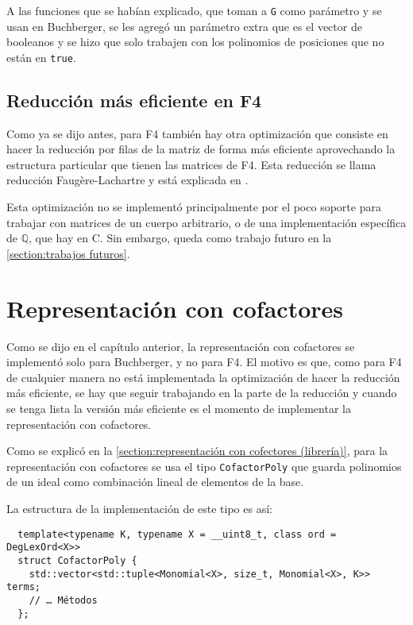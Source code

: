 \documentclass[12pt]{report}
\theoremstyle{customstyle}
\theoremstyle{factstyle}
\newcommand\cpp{C\nolinebreak[4]\hspace{-.05em}\raisebox{.4ex}{\relsize{-3}{\textbf{++}}}\xspace}
\begin{document}
A las funciones que se habían explicado, que toman a \texttt{G} como parámetro y se usan en Buchberger, se les agregó un parámetro extra que es el vector de booleanos y se hizo que solo trabajen con los polinomios de posiciones que no están en \texttt{true}.

\subsection{Reducción más eficiente en F4}\label{subsection:Reducción más eficiente en F4}

Como ya se dijo antes, para F4 también hay otra optimización que consiste en hacer la reducción por filas de la matriz de forma más eficiente aprovechando la estructura particular que tienen las matrices de F4. Esta reducción se llama reducción Faugère-Lachartre y está explicada en \cite{thesis:Hof20}.

Esta optimización no se implementó principalmente por el poco soporte para trabajar con matrices de un cuerpo arbitrario, o de una implementación específica de $ℚ$, que hay en \cpp. Sin embargo, queda como trabajo futuro en la \cref{section:trabajos futuros}.

\section{Representación con cofactores}

Como se dijo en el capítulo anterior, la representación con cofactores se implementó solo para Buchberger, y no para F4. El motivo es que, como para F4 de cualquier manera no está implementada la optimización de hacer la reducción más eficiente, se hay que seguir trabajando en la parte de la reducción y cuando se tenga lista la versión más eficiente es el momento de implementar la representación con cofactores.

Como se explicó en la \cref{section:representación con cofectores (librería)}, para la representación con cofactores se usa el tipo \texttt{CofactorPoly} que guarda polinomios de un ideal como combinación lineal de elementos de la base.

La estructura de la implementación de este tipo es así:

\begin{verbatim}
  template<typename K, typename X = __uint8_t, class ord = DegLexOrd<X>>
  struct CofactorPoly {
    std::vector<std::tuple<Monomial<X>, size_t, Monomial<X>, K>> terms;
    // … Métodos
  };
\end{verbatim}
\end{document}
